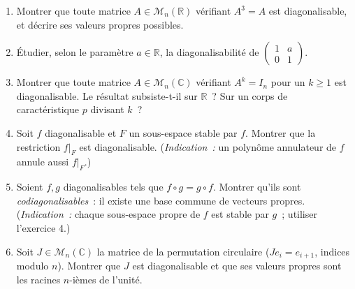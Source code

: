 \vspace{6pt}
\exolabel

\begin{mdframed}[style=exobar]
  \begin{enumerate}
    \item Montrer que toute matrice $A \in \mathcal{M}_n(\mathbb{R})$
          vérifiant $A^3 = A$ est diagonalisable, et décrire ses valeurs
          propres possibles.

    \item Étudier, selon le paramètre $a \in \mathbb{R}$, la
          diagonalisabilité de $\begin{pmatrix}1&a\\0&1\end{pmatrix}$.

    \item Montrer que toute matrice $A \in \mathcal{M}_n(\mathbb{C})$
          vérifiant $A^k = I_n$ pour un $k \geq 1$ est diagonalisable.
          Le résultat subsiste-t-il sur $\mathbb{R}$~? Sur un corps de
          caractéristique $p$ divisant $k$~?

    \item Soit $f$ diagonalisable et $F$ un sous-espace stable par $f$.
          Montrer que la restriction $f|_F$ est diagonalisable.
          (\textit{Indication~:} un polynôme annulateur de $f$ annule
          aussi $f|_F$.)

    \item {}Soient $f, g$ diagonalisables tels que
          $f \circ g = g \circ f$. Montrer qu'ils sont
          \emph{codiagonalisables}~: il existe une base commune de vecteurs
          propres. (\textit{Indication~:} chaque sous-espace propre de $f$
          est stable par $g$~; utiliser l'exercice 4.)

    \item Soit $J \in \mathcal{M}_n(\mathbb{C})$ la matrice de la
          permutation circulaire ($Je_i = e_{i+1}$, indices modulo $n$).
          Montrer que $J$ est diagonalisable et que ses valeurs propres
          sont les racines $n$-ièmes de l'unité.
  \end{enumerate}
\end{mdframed}

